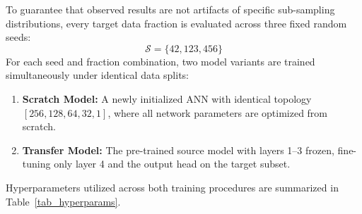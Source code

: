 \documentclass[conference]{IEEEtran}
\begin{document}
To guarantee that observed results are not artifacts of specific sub-sampling distributions, every target data fraction is evaluated across three fixed random seeds:
\begin{equation}
\mathcal{S} = \{42, 123, 456\}
\label{eq_seeds}
\end{equation}
For each seed and fraction combination, two model variants are trained simultaneously under identical data splits:
\begin{enumerate}
    \item \textbf{Scratch Model:} A newly initialized ANN with identical topology $[256, 128, 64, 32, 1]$, where all network parameters are optimized from scratch.
    \item \textbf{Transfer Model:} The pre-trained source model with layers 1--3 frozen, fine-tuning only layer 4 and the output head on the target subset.
\end{enumerate}

Hyperparameters utilized across both training procedures are summarized in Table~\ref{tab_hyperparams}.

\begin{table}[t]
\caption{Model Hyperparameters and Training Configuration}
\begin{center}
\label{tab_hyperparams}
\end{center}
\end{table}
\end{document}
